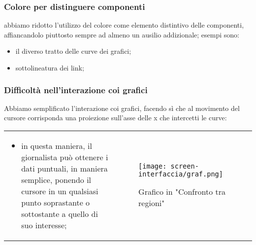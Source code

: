 \begin{frame}
    \frametitle{Colore per distinguere componenti}
    \label{f:colore}
    abbiamo ridotto l'utilizzo del colore come elemento distintivo delle componenti, affiancandolo piuttosto sempre ad almeno un ausilio addizionale; esempi sono:
    \begin{itemize}
        \item il diverso tratto delle curve dei grafici;
        \item sottolineatura dei link;
    \end{itemize}
\end{frame}

\begin{frame}
    \frametitle{Difficoltà nell'interazione coi grafici}
    \label{f:difficolta}
    Abbiamo semplificato l'interazione coi grafici, facendo sì che al movimento del cursore corrisponda una proiezione sull'asse delle x che intercetti le curve: 
    \begin{tabular}{p{}p{}}    
        \begin{itemize}
            \item in questa maniera, il giornalista può ottenere i dati puntuali, in maniera semplice, ponendo il cursore in un qualsiasi punto soprastante o sottostante a quello di suo interesse;
        \end{itemize} &
            
        \begin{figure}
            \centering
            \texttt{[image: screen-interfaccia/graf.png]}
            \caption{Grafico in "Confronto tra regioni"} 
        \end{figure}  \\
    \end{tabular}   
\end{frame}